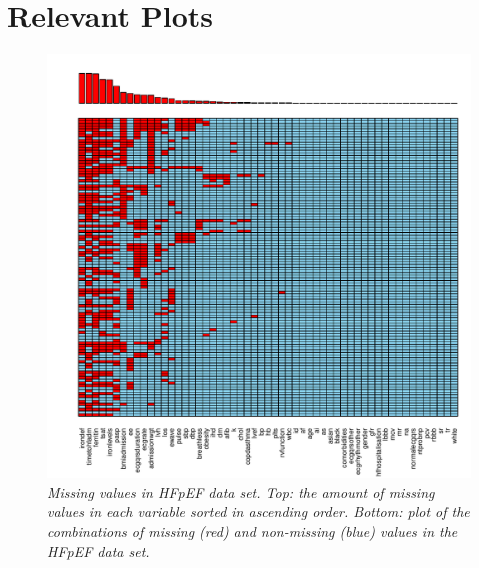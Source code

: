 \documentclass[../thesis.tex]{subfiles}
\begin{document}
\newpage



\newpage



\newpage



\newpage



\newpage



\newpage



\newpage



\newpage

\section{Relevant Plots}
\label{sec:rel_plots}

\begin{figure}[h!]
    \centering
    \hspace*{-1cm}\includegraphics[width=1.1\textwidth]{doc/thesis/images/HFpEF_miss_dist.pdf}
    \caption[Missing values in HFpEF data set]{\textit{Missing values in HFpEF data set. Top:  the amount of missing values in each variable sorted in ascending order. Bottom: plot of the combinations of missing (red) and non-missing (blue) values in the HFpEF data set.}}
    \label{fig:HFpEF_missing}
\end{figure}
\end{document}
